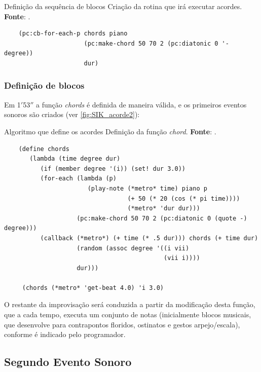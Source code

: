 \begin{example}{Definição da sequência de blocos}
  \centering
Criação da rotina que irá executar acordes. \textbf{Fonte}: \cite{sorensen_youtube_2014}.
  \begin{verbatim}
    (pc:cb-for-each-p chords piano
                      (pc:make-chord 50 70 2 (pc:diatonic 0 '- degree))
                      dur)
  \end{verbatim}
  \label{fig:SIK_acorde}
\end{example}

\subsubsection*{Definição de blocos}

Em 1$'$53$''$ a função \emph{chords} é definida de maneira válida, e os primeiros eventos sonoros são criados (ver \autoref{fig:SIK_acorde2}):

\begin{example}{Algoritmo que define os acordes}
  \centering
Definição da função \emph{chord}. \textbf{Fonte}: \cite{sorensen_youtube_2014}.
  \begin{verbatim}
    (define chords
       (lambda (time degree dur)
          (if (member degree '(i)) (set! dur 3.0))
          (for-each (lambda (p)
                       (play-note (*metro* time) piano p
                                  (+ 50 (* 20 (cos (* pi time))))
                                  (*metro* 'dur dur)))
                    (pc:make-chord 50 70 2 (pc:diatonic 0 (quote -) degree)))
          (callback (*metro*) (+ time (* .5 dur))) chords (+ time dur)
                    (random (assoc degree '((i vii)
                                            (vii i))))
                    dur)))
    
     (chords (*metro* 'get-beat 4.0) 'i 3.0)
  \end{verbatim}
  \label{fig:SIK_acorde2}
\end{example}

O restante da improvisação será conduzida a partir da modificação desta função, que a cada tempo, executa um conjunto de notas (inicialmente blocos musicais, que desenvolve para contrapontos floridos, ostinatos e gestos  arpejo/escala), conforme é indicado pelo programador.


\subsection{Segundo Evento Sonoro}\label{sec:segundoevento}


